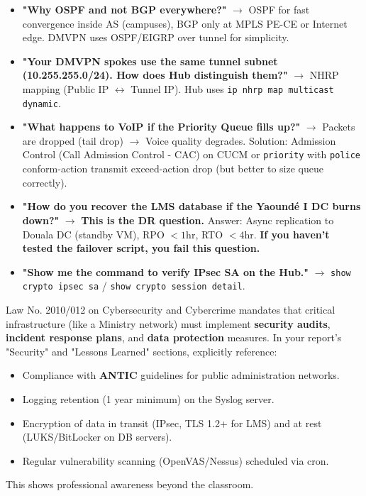 \documentclass[11pt]{article}
\begin{document}
\begin{attention}
\begin{itemize}
    \item \textbf{"Why OSPF and not BGP everywhere?"} $\rightarrow$ OSPF for fast convergence inside AS (campuses), BGP only at MPLS PE-CE or Internet edge. DMVPN uses OSPF/EIGRP over tunnel for simplicity.
    \item \textbf{"Your DMVPN spokes use the same tunnel subnet (10.255.255.0/24). How does Hub distinguish them?"} $\rightarrow$ NHRP mapping (Public IP $\leftrightarrow$ Tunnel IP). Hub uses \texttt{ip nhrp map multicast dynamic}.
    \item \textbf{"What happens to VoIP if the Priority Queue fills up?"} $\rightarrow$ Packets are dropped (tail drop) $\rightarrow$ Voice quality degrades. Solution: Admission Control (Call Admission Control - CAC) on CUCM or \texttt{priority} with \texttt{police} conform-action transmit exceed-action drop (but better to size queue correctly).
    \item \textbf{"How do you recover the LMS database if the Yaoundé I DC burns down?"} $\rightarrow$ \textbf{This is the DR question.} Answer: Async replication to Douala DC (standby VM), RPO $< 1$hr, RTO $< 4$hr. \textbf{If you haven't tested the failover script, you fail this question.}
    \item \textbf{"Show me the command to verify IPsec SA on the Hub."} $\rightarrow$ \texttt{show crypto ipsec sa} / \texttt{show crypto session detail}.
\end{itemize}
\end{attention}

\begin{savaistu}
Law No. 2010/012 on Cybersecurity and Cybercrime mandates that critical infrastructure (like a Ministry network) must implement \textbf{security audits}, \textbf{incident response plans}, and \textbf{data protection} measures. In your report's "Security" and "Lessons Learned" sections, explicitly reference:
\begin{itemize}
    \item Compliance with \textbf{ANTIC} guidelines for public administration networks.
    \item Logging retention (1 year minimum) on the Syslog server.
    \item Encryption of data in transit (IPsec, TLS 1.2+ for LMS) and at rest (LUKS/BitLocker on DB servers).
    \item Regular vulnerability scanning (OpenVAS/Nessus) scheduled via cron.
\end{itemize}
This shows professional awareness beyond the classroom.
\end{savaistu}
\end{document}
